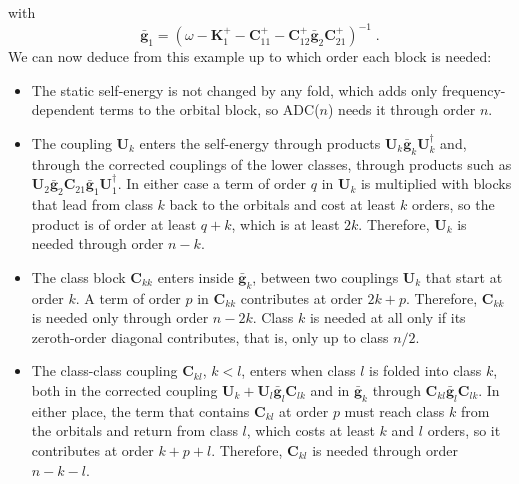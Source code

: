 \documentclass[aip,jcp,reprint,noshowkeys,superscriptaddress]{revtex4-2}
\theoremstyle{plain}
\theoremstyle{definition}
\theoremstyle{remark}
\begin{document}
with 
\begin{equation}
\bar{\mathbf{g}}_1=(\omega-\mathbf{K}^{+}_1-\mathbf{C}^{+}_{11}-\mathbf{C}^{+}_{12}\bar{\mathbf{g}}_2\mathbf{C}^{+}_{21})^{-1} \;.
\end{equation}
We can now deduce from this example up to which order each block is needed:
\begin{itemize}
\item The static self-energy is not changed by any fold, which adds only frequency-dependent terms to the orbital block, so ADC($n$) needs it through order $n$.
\item The coupling $\mathbf{U}_k$ enters the self-energy through products $\mathbf{U}_k\bar{\mathbf{g}}_k\mathbf{U}_k^\dagger$ and, through the corrected couplings of the lower classes, through products such as $\mathbf{U}_2\bar{\mathbf{g}}_2\mathbf{C}_{21}\bar{\mathbf{g}}_1\mathbf{U}_1^\dagger$. In either case a term of order $q$ in $\mathbf{U}_k$ is multiplied with blocks that lead from class $k$ back to the orbitals and cost at least $k$ orders, so the product is of order at least $q+k$, which is at least $2k$. Therefore, $\mathbf{U}_k$ is needed through order $n-k$.

\item The class block $\mathbf{C}_{kk}$ enters inside $\bar{\mathbf{g}}_k$, between two couplings $\mathbf{U}_k$ that start at order $k$. A term of order $p$ in $\mathbf{C}_{kk}$ contributes at order $2k+p$. Therefore, $\mathbf{C}_{kk}$ is needed only through order $n-2k$. Class $k$ is needed at all only if its zeroth-order diagonal contributes, that is, only up to class $n/2$.
\item The class-class coupling $\mathbf{C}_{kl}$, $k<l$, enters when class $l$ is folded into class $k$, both in the corrected coupling $\mathbf{U}_k+\mathbf{U}_l\bar{\mathbf{g}}_l\mathbf{C}_{lk}$ and in $\bar{\mathbf{g}}_k$ through $\mathbf{C}_{kl}\bar{\mathbf{g}}_l\mathbf{C}_{lk}$. In either place, the term that contains $\mathbf{C}_{kl}$ at order $p$ must reach class $k$ from the orbitals and return from class $l$, which costs at least $k$ and $l$ orders, so it contributes at order $k+p+l$. Therefore, $\mathbf{C}_{kl}$ is needed through order $n-k-l$.
\end{itemize}
\end{document}
